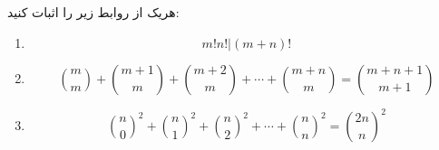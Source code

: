 \EXERCISE
هریک از روابط زیر را اثبات کنید:
\begin{enumerate}
\item
$$m!n! | (m + n)!$$
\item
$$\binom m m + \binom{m+1}{m} + \binom{m+2}{m} + \cdots + \binom{m+n}{m} = \binom{m+n+1}{m+1}$$
\item
$${\binom{n}{0}}^2 + {\binom{n}{1}}^2 + {\binom{n}{2}}^2 + \cdots + {\binom{n}{n}}^2 = {\binom{2n}{n}}^2$$
\end{enumerate}